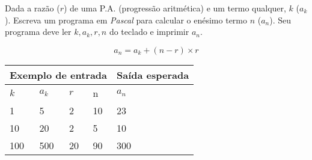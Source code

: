 \item Dada a razão ($r$) de uma P.A. (progressão aritmética) e um termo 
qualquer, $k$ ($a_k$). Escreva um programa em \emph{Pascal} para calcular 
o enésimo termo $n$ ($a_n$). Seu programa deve ler $k, a_k, r, n$ do teclado
e imprimir $a_n$.

\[
a_n = a_k + (n-r) \times r
\]

\begin{center}
\begin{tabular}{|l|l|l|l|l|} \hline
\multicolumn{4}{|c|}{Exemplo de entrada} & Saída esperada \\ \hline
$k$ & $a_k$ & $r$ & n   & $a_n$             \\ \hline
1 & 5 & 2 & 10          & 23                \\ \hline
10 & 20 & 2 & 5         & 10                \\ \hline
100 & 500 & 20 & 90     & 300               \\ \hline
\end{tabular}
\end{center}